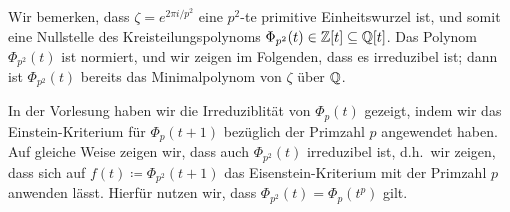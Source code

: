 Wir bemerken, dass $\zeta = e^{2 \pi i / p^2}$ eine $p^2$-te primitive Einheitswurzel ist, und somit eine Nullstelle des Kreisteilungspolynoms $\Phi_{p^2}(t) \in \mathbb{Z}[t] \subseteq \mathbb{Q}[t]$.
Das Polynom $\Phi_{p^2}(t)$ ist normiert, und wir zeigen im Folgenden, dass es irreduzibel ist;
dann ist $\Phi_{p^2}(t)$ bereits das Minimalpolynom von $\zeta$ über $\mathbb{Q}$.

In der Vorlesung haben wir die Irreduziblität von $\Phi_p(t)$ gezeigt, indem wir das Einstein-Kriterium für $\Phi_p(t+1)$ bezüglich der Primzahl $p$ angewendet haben.
Auf gleiche Weise zeigen wir, dass auch $\Phi_{p^2}(t)$ irreduzibel ist, d.h.\ wir zeigen, dass sich auf $f(t) \coloneqq \Phi_{p^2}(t+1)$ das Eisenstein-Kriterium mit der Primzahl $p$ anwenden lässt.
Hierfür nutzen wir, dass $\Phi_{p^2}(t) = \Phi_p(t^p)$ gilt.

